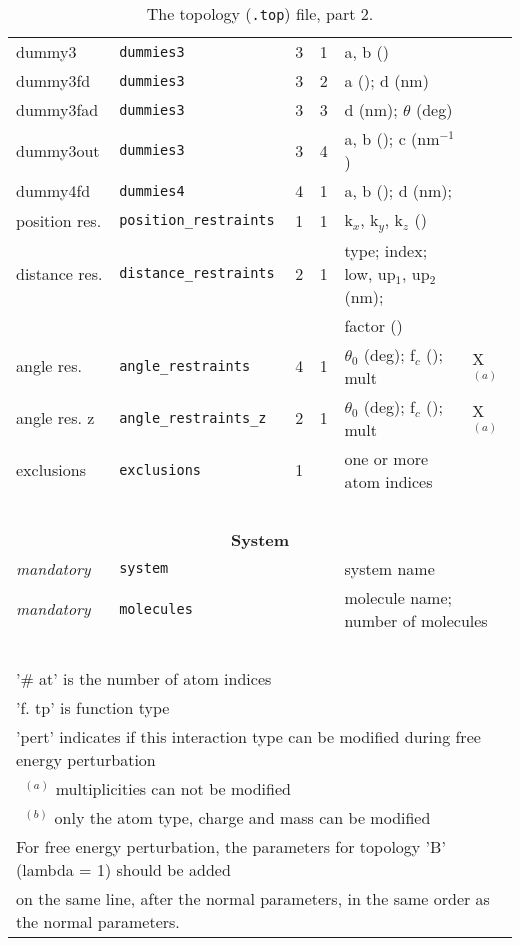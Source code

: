 \begin{table}[p]
{\begin{tabular}{|l|lllll|}
dummy3		& {\tt dummies3}	& 3 & 1	& a, b ()				& 	\\
dummy3fd	& {\tt dummies3}	& 3 & 2	& a (); d (nm)				& 	\\
dummy3fad	& {\tt dummies3}	& 3 & 3	& d (nm); $\theta$ (deg) 		& 	\\
dummy3out	& {\tt dummies3}	& 3 & 4	& a, b (); c (nm$^{-1}$) 		& 	\\
dummy4fd	& {\tt dummies4}	& 4 & 1	& a, b (); d (nm);	   		& 	\\
position res.	& {\tt position\_restraints}	& 1 & 1	& k$_{x}$, k$_{y}$, k$_{z}$ (\kJmolnm{-2}) & 	\\
distance res.	& {\tt distance\_restraints}	& 2 & 1	& type; index; low, up$_1$, up$_2$ (nm); & \\
 & & & & factor () & \\
angle res.	& {\tt angle\_restraints}	& 4 & 1	& $\theta_0$ (deg); f$_c$ (\kJmol); mult & X$^{(a)}$	\\
angle res. z & {\tt angle\_restraints\_z}	& 2 & 1	& $\theta_0$ (deg); f$_c$ (\kJmol); mult & X$^{(a)}$	\\
exclusions	& {\tt exclusions}	& 1 & 	& one or more atom indices				& 	\\
\hline
\multicolumn{6}{c}{~} \\
\multicolumn{6}{c}{\bf \large System} \\
\hline
{\em mandatory} & {\tt system}		& & &	system name				&	\\
\hline
{\em mandatory} & {\tt molecules}	& & &	\multicolumn{2}{l|}{molecule name; number of molecules}	\\
\hline
\multicolumn{6}{c}{~} \\
\multicolumn{6}{l}{'\# at' is the number of atom indices} \\
\multicolumn{6}{l}{'f. tp' is function type} \\
\multicolumn{6}{l}{'pert' indicates if this interaction type
can be modified during free energy perturbation} \\
\multicolumn{6}{l}{~$^{(a)}$ multiplicities can not be modified} \\
\multicolumn{6}{l}{~$^{(b)}$ only the atom type, charge and mass can be modified} \\
\multicolumn{6}{l}{For free energy perturbation, the parameters for topology 'B' (lambda = 1) should be added} \\
\multicolumn{6}{l}{on the same line, after the normal parameters,
in the same order as the normal parameters.} \\
\end{tabular}
}
\caption{The topology ({\tt *.top}) file, part 2.}
\label{ta:topfile2}
\end{table}
\clearpage

